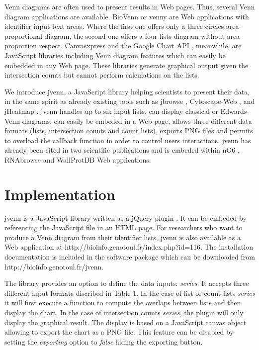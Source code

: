 \documentclass{bmcart}
\begin{document}
Venn diagrams are often used to present results in Web pages. Thus, several Venn diagram applications are 
available. BioVenn \cite{Hulsen2008} or venny \cite{venny} are Web applications with identifier input text 
areas. Where the first one offers only a three circles area-proportional diagram, the second one offers a 
four lists diagram without area proportion respect. Canvasxpress \cite{canvasxpress} and the Google Chart 
API \cite{googleAPI}, meanwhile, are JavaScript libraries including Venn diagram features which can easily 
be embedded in any Web page. These libraries generate graphical output given the intersection counts but 
cannot perform calculations on the lists.
\cite{Bronwen2012}
\cite{RVennDiagram}


We introduce jvenn, a JavaScript library helping scientists to present their data, in the same spirit as already 
existing tools such as jbrowse \cite{Westesson01032013}, Cytoscape-Web \cite{Lopes2010}, and jHeatmap \cite{DeuPons2014}. 
jvenn handles up to six input lists, can display classical or Edwards-Venn \cite{Edwards2004} diagrams, can easily be 
embeded in a Web page, allows three different data formats (lists, intersection counts and count lists), exports PNG files and permits 
to overload the callback function in order to control users interactions. jvenn has already been cited in two scientific 
publications \cite{Bianchia2013, Aravindraja2013} and is embeded within nG6 \cite{Mariette2012}, RNAbrowse \cite{Mariette} and 
WallProtDB \cite{SanClemente} Web applications.


\section*{Implementation}

jvenn is a JavaScript library written as a jQuery plugin \cite{jquery}. It can be embeded by referencing the JavaScript file 
in an HTML page. For researchers who want to produce a Venn diagram from their identifier lists, jvenn is also available as a 
Web application at http://bioinfo.genotoul.fr/index.php?id=116. The installation documentation is included in the software package 
which can be downloaded from http://bioinfo.genotoul.fr/jvenn.

The library provides an option to define the data inputs: \textit{series}. It accepts three different input formats discribed in 
Table 1. In the case of list or count lists \textit{series} it will first execute a function to compute the overlaps between lists and then
display the chart. In the case of intersection counts \textit{series}, the plugin will only display the graphical result. The display 
is based on a JavaScript canvas object allowing to export the chart as a PNG file. This feature can be disabled by setting the \textit{exporting} 
option to \textit{false} hiding the exporting button.
\end{document}
